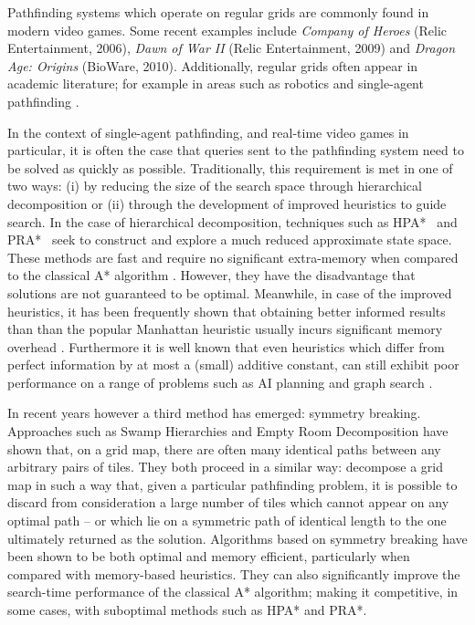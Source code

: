 Pathfinding systems which operate on regular grids are commonly found in modern video games.
Some recent examples include \emph{Company of Heroes} (Relic Entertainment, 2006), \emph{Dawn of War II} (Relic
Entertainment, 2009) and \emph{Dragon Age: Origins} (BioWare, 2010).
Additionally, regular grids often appear in academic literature; for example in areas such as robotics \cite{latombe92} and
single-agent pathfinding \cite{yap02,botea04,sturtevant07,harabor10}.
\par
In the context of single-agent pathfinding, and real-time video games in particular, it is often the case that queries sent to
the pathfinding system  need to be solved as quickly as possible.
Traditionally, this requirement is met in one of two ways: (i) by reducing the size of the search space through hierarchical 
decomposition or (ii) through the development of improved heuristics to guide search.
In the case of hierarchical decomposition, techniques such as
HPA*~\cite{botea04} and PRA*~\cite{sturtevant05} seek to construct and explore
a much reduced approximate state space.
These methods are fast and require no significant extra-memory when compared to the classical
A* algorithm \cite{hart68}.
However, they have the disadvantage that solutions are not guaranteed to be optimal.
Meanwhile, in case of the improved heuristics, it has been frequently shown
that obtaining better informed results than than the popular
Manhattan heuristic usually incurs significant memory overhead 
\cite{sturtevant09,goldberg05,Cazenave:06,bjornsson06}.
Furthermore it is well known that even heuristics which differ from perfect information 
by at most a (small) additive constant, can still exhibit poor performance on a range of 
problems such as AI planning and graph search \cite{helmert08,pohl77}.
\par
In recent years however a third method has emerged: symmetry breaking.
Approaches such as Swamp Hierarchies \cite{pochter10} and Empty Room Decomposition \cite{harabor10} have shown that,
on a grid map, there are often many identical paths between any arbitrary pairs of tiles.
They both proceed in a similar way: decompose a grid map in such a way that, given a particular pathfinding problem, it is possible to
discard from consideration a large number of tiles which cannot appear on any optimal path -- or which lie on a symmetric
path of identical length to the one ultimately returned as the solution.
Algorithms based on symmetry breaking have been shown to be both optimal and memory efficient, particularly when
compared with memory-based heuristics.
They can also significantly improve the search-time performance of the classical A* algorithm; making it competitive,
in some cases, with suboptimal methods such as HPA* and PRA*.
\par

